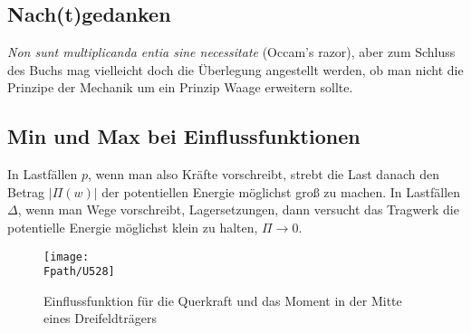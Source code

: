 {{{{{{%
\textcolor{blau2}{\section{Nach(t)gedanken}}
{\em Non sunt multiplicanda entia sine necessitate\/} (Occam's razor), aber zum Schluss des Buchs mag vielleicht doch die \"{U}berlegung angestellt werden, ob man nicht die Prinzipe der Mechanik um ein Prinzip Waage erweitern sollte. 

{\textcolor{sectionTitleBlue}{\section{Min und Max bei Einflussfunktionen}}}
In Lastf\"{a}llen $p$, wenn man also Kr\"{a}fte vorschreibt, strebt die Last danach den Betrag $|\Pi(w)|$ der potentiellen Energie m\"{o}glichst gro{\ss} zu machen. In Lastf\"{a}llen $\Delta $, wenn man Wege vorschreibt, Lagersetzungen, dann versucht das Tragwerk die potentielle Energie m\"{o}glichst klein zu halten, $\Pi \to 0$.

\begin{figure}[tbp]
\centering
\texttt{[image: \\Fpath/U528]}
\caption{Einflussfunktion f\"{u}r die Querkraft und das Moment in der Mitte eines Dreifeldtr\"{a}gers}
\label{U528}%
\end{figure}%

}}}}}}
